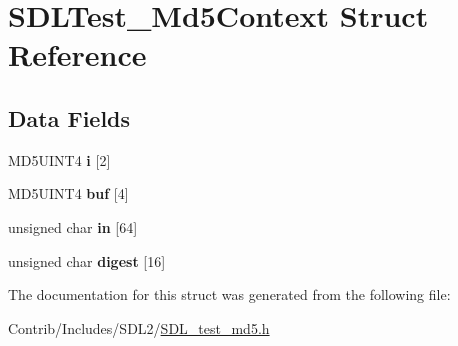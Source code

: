 \hypertarget{struct_s_d_l_test___md5_context}{}\section{S\+D\+L\+Test\+\_\+\+Md5\+Context Struct Reference}
\label{struct_s_d_l_test___md5_context}
\subsection*{Data Fields}
\begin{DoxyCompactItemize}
\item 
M\+D5\+U\+I\+N\+T4 {\bfseries i} \mbox{[}2\mbox{]}\hypertarget{struct_s_d_l_test___md5_context_a36da318d35991087e6998029531a6095}{}\label{struct_s_d_l_test___md5_context_a36da318d35991087e6998029531a6095}

\item 
M\+D5\+U\+I\+N\+T4 {\bfseries buf} \mbox{[}4\mbox{]}\hypertarget{struct_s_d_l_test___md5_context_ae59b89a08f08c58536cfde6d747a2c50}{}\label{struct_s_d_l_test___md5_context_ae59b89a08f08c58536cfde6d747a2c50}

\item 
unsigned char {\bfseries in} \mbox{[}64\mbox{]}\hypertarget{struct_s_d_l_test___md5_context_a3a40a33a5c6b34a5d53569057cbe8c4c}{}\label{struct_s_d_l_test___md5_context_a3a40a33a5c6b34a5d53569057cbe8c4c}

\item 
unsigned char {\bfseries digest} \mbox{[}16\mbox{]}\hypertarget{struct_s_d_l_test___md5_context_a9c185c9970b81e602c4374ffe2c117e8}{}\label{struct_s_d_l_test___md5_context_a9c185c9970b81e602c4374ffe2c117e8}

\end{DoxyCompactItemize}


The documentation for this struct was generated from the following file\+:\begin{DoxyCompactItemize}
\item 
Contrib/\+Includes/\+S\+D\+L2/\hyperlink{_s_d_l__test__md5_8h}{S\+D\+L\+\_\+test\+\_\+md5.\+h}\end{DoxyCompactItemize}
